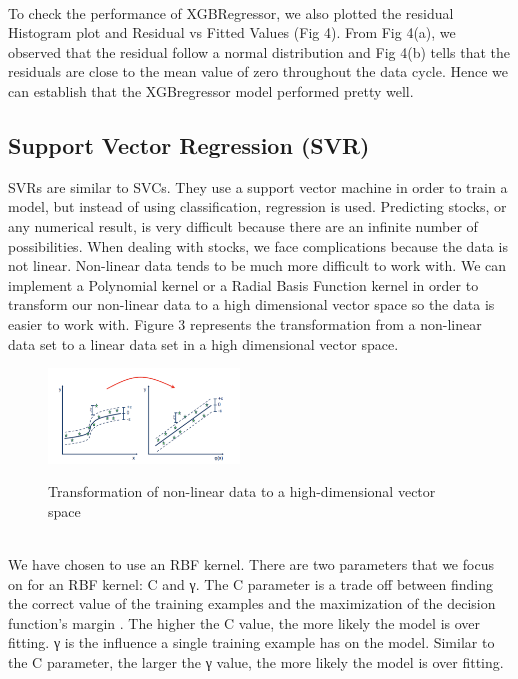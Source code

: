 \usepackage{fancyhdr}\documentclass[conference]{IEEEtran}
\begin{document}
\\
To check the performance of XGBRegressor, we also plotted the residual Histogram plot and Residual vs Fitted Values (Fig 4). From Fig 4(a), we observed that the residual follow a normal distribution and Fig 4(b) tells that the residuals are close to the mean value of zero throughout the data cycle. Hence we can establish that the XGBregressor model performed pretty well.


\subsection{Support Vector Regression (SVR)}
SVRs are similar to SVCs. They use a support vector machine in order to train a model, but instead of using classification, regression is used. Predicting stocks, or any numerical result, is very difficult because there are an infinite number of possibilities. When dealing with stocks, we face complications because the data is not linear. Non-linear data tends to be much more difficult to work with. We can implement a Polynomial kernel or a Radial Basis Function kernel in order to transform our non-linear data to a high dimensional vector space so the data is easier to work with. Figure 3 represents the transformation from a non-linear data set to a linear data set in a high dimensional vector space\cite{3}. 
\\
\begin{figure}[h]
    \centering
    \subfigure
    {
        \includegraphics[width=2.0in]{nonlin.png}
        \label{fig:first_sub}
    }
    \caption{Transformation of non-linear data to a high-dimensional vector space}
    \label{fig:sample_subfigures}
\end{figure}
\\
We have chosen to use an RBF kernel. There are two parameters that we focus on for an RBF kernel: C and  γ. The C parameter is a trade off between finding the correct value of the training examples and the maximization of the decision function’s margin \cite{4}. The higher the C value, the more likely the model is over fitting. γ is the influence a single training example has on the model\cite{4}. Similar to the C parameter, the larger the γ value, the more likely the model is over fitting. 
\end{document}
